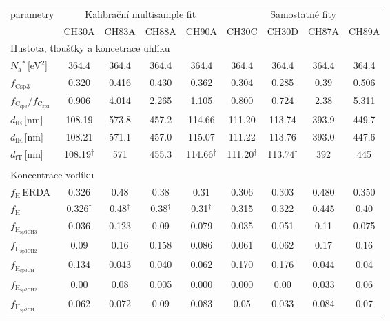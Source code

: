\begin{tabular}{lcccccccc}
\hline
parametry & \multicolumn{4}{c}{Kalibrační multisample fit} & \multicolumn{4}{c}{Samostatné fity}\\
 & CH30A & CH83A & CH88A & CH90A & CH30C & CH30D & CH87A & CH89A\\
\hline
\multicolumn{9}{l}{Hustota, tloušťky a koncetrace uhlíku}\\
\hline
$N_\mathrm{a}$$^\ast$\,[eV$^2$] & 364.4 & 364.4 & 364.4 & 364.4 & 364.4 & 364.4 & 364.4 & 364.4\\
$f_\mathrm{Csp3}$ & 0.320 & 0.416 & 0.430 & 0.362 & 0.304 & 0.285 & 0.39 & 0.506\\
$f_\mathrm{C_{sp3}}/f_\mathrm{C_{sp2}}$ & 0.906 & 4.014 & 2.265 & 1.105 & 0.800 & 0.724 & 2.38 & 5.311\\
$d_\mathrm{fE}$\,[nm] & 108.19 & 573.8 & 457.2 & 114.66 & 111.20 & 113.74 & 393.9 & 449.7\\
$d_\mathrm{fR}$\,[nm] & 108.21 & 571.1 & 457.0 & 115.07 & 111.22 & 113.76 & 393.0 & 447.6\\
$d_\mathrm{fT}$\,[nm] & 108.19$^\ddagger$ & 571 & 455.3 & 114.66$^\ddagger$ & 111.20$^\ddagger$ & 113.74$^\ddagger$ & 392 & 445\\


\multicolumn{9}{l}{}\\
\multicolumn{9}{l}{Koncentrace vodíku}\\
\hline
$f_\mathrm{H}$\,ERDA & 0.326 & 0.48 & 0.38 & 0.31 & 0.306 & 0.303 & 0.480 & 0.350\\
$f_\mathrm{H}$ & 0.326$^\dagger$ & 0.48$^\dagger$ & 0.38$^\dagger$ & 0.31$^\dagger$ & 0.315 & 0.322 & 0.445 & 0.40\\
$f_\mathrm{H_{sp3CH3}}$ & 0.036 & 0.123 & 0.09 & 0.079 & 0.035 & 0.051 & 0.11 & 0.075\\
$f_\mathrm{H_{sp3CH2}}$ & 0.09 & 0.16 & 0.158 & 0.086 & 0.061 & 0.062 & 0.17 & 0.16\\
$f_\mathrm{H_{sp3CH}}$ & 0.134 & 0.043 & 0.040 & 0.062 & 0.170 & 0.176 & 0.044 & 0.04\\
$f_\mathrm{H_{sp2CH2}}$ & 0.00 & 0.08 & 0.005 & 0.000 & 0.000 & 0.00 & 0.033 & 0.06\\
$f_\mathrm{H_{sp2CH}}$ & 0.062 & 0.072 & 0.09 & 0.083 & 0.05 & 0.033 & 0.084 & 0.07\\



\end{tabular}
